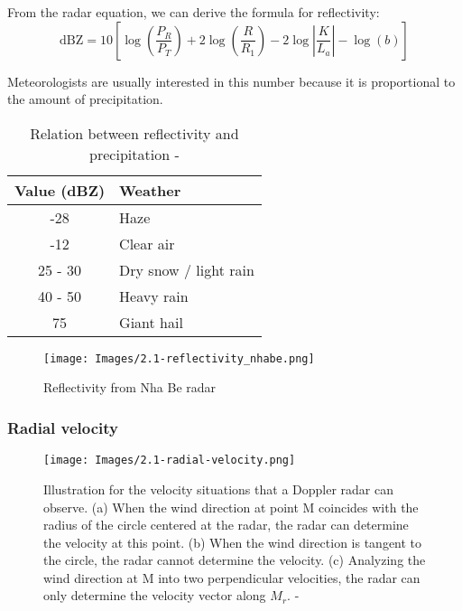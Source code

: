 From the radar equation, we can derive the formula for reflectivity:
\vspace{0.5cm}
\[
    \text{dBZ} = 10\left[ \log\left( \frac{P_R}{P_T} \right) + 2 \log\left( \frac{R}{R_1} \right) - 2\log\left| \frac{K}{L_a} \right| - \log\left( b \right) \right]
\]

Meteorologists are usually interested in this number because it is proportional to the amount of precipitation.

\begin{table}[h]
    \centering
    \begin{tabular}{|c|l|}
        \hline
        Value (dBZ) & Weather               \\
        \hline
        -28         & Haze                  \\
        -12         & Clear air             \\
        25 - 30     & Dry snow / light rain \\
        40 - 50     & Heavy rain            \\
        75          & Giant hail            \\
        \hline
    \end{tabular}
    \vspace{1em}
    \caption{ Relation between reflectivity and precipitation -
    \citet{2022Weather}}
\end{table}

\begin{figure}[H]
    \centering
    \texttt{[image: Images/2.1-reflectivity\_nhabe.png]}
    \vspace{1em}
    \caption{Reflectivity from Nha Be radar}
    \label{fig:reflectivity-nhabe}
\end{figure}

\subsubsection{Radial velocity}

\begin{figure}[H]
    \centering
    \texttt{[image: Images/2.1-radial-velocity.png]}
    \vspace{2em}
    \caption{Illustration for the velocity situations that a Doppler radar can
    observe. (a) When the wind direction at point M coincides with the radius of
    the circle centered at the radar, the radar can determine the velocity at
    this point. (b) When the wind direction is tangent to the circle, the radar
    cannot determine the velocity. (c) Analyzing the wind direction at M into
    two perpendicular velocities, the radar can only determine the velocity
    vector along $M_r$.  - \citet{2022Weather}}
    \label{fig:radial-velocity}
\end{figure}

